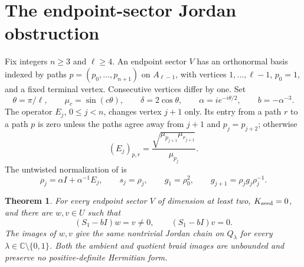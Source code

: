 \documentclass[11pt,a4paper]{article}
\newtheorem{theorem}{Theorem}
\newcommand{\C}{\mathbb C}
\begin{document}
\section{The endpoint-sector Jordan obstruction}

Fix integers $n\ge3$ and $\ell\ge4$. An endpoint sector $V$ has an
orthonormal basis indexed by paths
$p=(p_0,\ldots,p_{n+1})$ on $A_{\ell-1}$, with vertices
$1,\ldots,\ell-1$, $p_0=1$, and a fixed terminal vertex.
Consecutive vertices differ by one. Set
\[
 \theta=\pi/\ell,\qquad \mu_c=\sin(c\theta),\qquad
 \delta=2\cos\theta,\qquad
 \alpha=i e^{-i\theta/2},\qquad b=-\alpha^{-3}.
\]
The operator $E_j$, $0\le j<n$, changes vertex $j+1$ only.
Its entry from a path $r$ to a path $p$ is zero unless the paths
agree away from $j+1$ and $p_j=p_{j+2}$; otherwise
\begin{equation}\label{eq:E}
 (E_j)_{p,r}=
 \frac{\sqrt{\mu_{p_{j+1}}\mu_{r_{j+1}}}}{\mu_{p_j}}.
\end{equation}
The untwisted normalization of \cite[Remark~6.7(b)]{Negami} is
\[
 \rho_j=\alpha I+\alpha^{-1}E_j,\qquad s_j=\rho_j,
 \qquad g_1=\rho_0^2,\qquad
 g_{j+1}=\rho_jg_j\rho_j^{-1}.
\]

\begin{theorem}\label{thm:jordan}
For every endpoint sector $V$ of dimension at least two,
$K_{\rm seed}=0$, and there are $w,v\in U$ such that
\[
 (S_1-bI)w=v\ne0,\qquad (S_1-bI)v=0.
\]
The images of $w,v$ give the same nontrivial Jordan chain on
$Q_\lambda$ for every $\lambda\in\C\setminus\{0,1\}$.
Both the ambient and quotient braid images are unbounded and preserve
no positive-definite Hermitian form.
\end{theorem}
\end{document}
